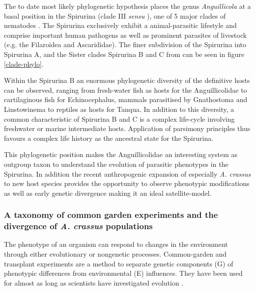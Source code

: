 The to date most likely phylogenetic hypothesis places the genus
\textit{Anguillicola} at a basal position in the Spirurina (clade III
\textit{sensu} \cite{blaxter_molecular_1998}), one of 5 major clades
of nematodes \cite{nadler_molecular_2007,
  wijov_evolutionary_2006}. The Spirurina exclusively exhibit a
animal-parasitic lifestyle and comprise important human pathogens as
well as prominent parasites of livestock (e.g. the Filaroidea and
Ascarididae). The finer subdivision of the Spirurina into Spirurina A,
and the Sister clades Spirurina B and C from \cite{dl_py} can be seen
in figure \ref{clade-phylo}.


Within the Spirurina B an enormous phylogenetic diversity of the
definitive hosts can be observed, ranging from fresh-water fish as
hosts for the Anguillicolidae to cartilaginous fish for
Echinocephalus, mammals parasitised by Gnathostoma and Linstowinema to
reptiles as hosts for Tanqua. In addition to this diversity, a common
characteristic of Spirurina B and C is a complex life-cycle involving
freshwater or marine intermediate hosts. Application of parsimony
principles thus favours a complex life history as the ancestral state
for the Spirurina.

This phylogenetic position makes the Anguillicolidae an interesting
system as outgroup taxon to understand the evolution of parasitic
phenotypes in the Spirurina. In addition the recent anthropogenic
expansion of especially \textit{A. crassus} to new host species
provides the opportunity to observe phenotypic modifications as well
as early genetic divergence making it an ideal satellite-model.

\subsubsection{A taxonomy of common garden experiments and the
  divergence of \textit{A. crassus} populations}
\label{div-ac}

The phenotype of an organism can respond to changes in the environment
through either evolutionary or nongenetic processes. Common-garden and
transplant experiments are a method to separate genetic components (G)
of phenotypic differences from environmental (E) influences. They have
been used for almost as long as scientists have investigated evolution
\cite{kerner_classic_common_garden, bonnier_classic_common_garden}.

